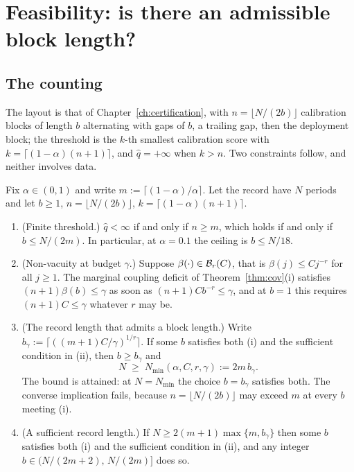 \documentclass[../../../main.tex]{subfiles}
\begin{document}
\section{Feasibility: is there an admissible block length?}\label{sec:zar-feasibility}

\subsection{The counting}

The layout is that of Chapter~\ref{ch:certification}, with $n=\lfloor N/(2b)\rfloor$ calibration blocks of length $b$ alternating with gaps of $b$, a trailing gap, then the deployment block; the threshold is the $k$-th smallest calibration score with $k=\lceil(1-\alpha)(n+1)\rceil$, and $\hat q=+\infty$ when $k>n$. Two constraints follow, and neither involves data.

\begin{proposition}\label{prop:zar-feasible}
Fix $\alpha\in(0,1)$ and write $m:=\lceil(1-\alpha)/\alpha\rceil$. Let the record have $N$ periods and let $b\ge1$, $n=\lfloor N/(2b)\rfloor$, $k=\lceil(1-\alpha)(n+1)\rceil$.
\begin{enumerate}[nosep,label=(\roman*)]
\item \textup{(Finite threshold.)} $\hat q<\infty$ if and only if $n\ge m$, which holds if and only if $b\le N/(2m)$. In particular, at $\alpha=0.1$ the ceiling is $b\le N/18$.
\item \textup{(Non-vacuity at budget $\gamma$.)} Suppose $\beta(\cdot)\in\mathcal B_{r}(C)$, that is $\beta(j)\le Cj^{-r}$ for all $j\ge1$. The marginal coupling deficit of Theorem~\ref{thm:cov}\textup{(i)} satisfies $(n+1)\beta(b)\le\gamma$ as soon as $(n+1)Cb^{-r}\le\gamma$, and at $b=1$ this requires $(n+1)C\le\gamma$ whatever $r$ may be.
\item \textup{(The record length that admits a block length.)} Write $b_\gamma:=\lceil((m+1)C/\gamma)^{1/r}\rceil$. If some $b$ satisfies both \textup{(i)} and the sufficient condition in \textup{(ii)}, then $b\ge b_\gamma$ and
\[
N\;\ge\;N_{\min}(\alpha,C,r,\gamma):=2m\,b_\gamma .
\]
The bound is attained: at $N=N_{\min}$ the choice $b=b_\gamma$ satisfies both. The converse implication fails, because $n=\lfloor N/(2b)\rfloor$ may exceed $m$ at every $b$ meeting \textup{(i)}.
\item \textup{(A sufficient record length.)} If $N\ge2(m+1)\max\{m,b_\gamma\}$ then some $b$ satisfies both \textup{(i)} and the sufficient condition in \textup{(ii)}, and any integer $b\in\big(N/(2m+2),\,N/(2m)\big]$ does so.
\end{enumerate}
\end{proposition}
\end{document}
